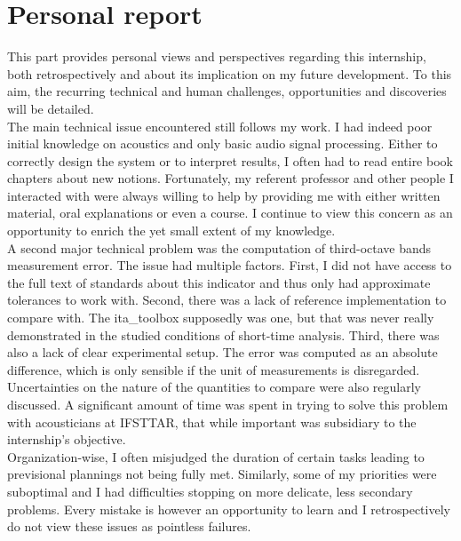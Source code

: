 \documentclass[12pt,times,onecolumn]{article}
\begin{document}
\clearpage
\part{Personal report}

This part provides personal views and perspectives regarding this internship, both retrospectively and about its implication on my future development. To this aim, the recurring technical and human challenges, opportunities and discoveries will be detailed.\\

The main technical issue encountered still follows my work. I had indeed poor initial knowledge on acoustics and only basic audio signal processing. Either to correctly design the system or to interpret results, I often had to read entire book chapters about new notions. Fortunately, my referent professor and other people I interacted with were always willing to help by providing me with either written material, oral explanations or even a course. I continue to view this concern as an opportunity to enrich the yet small extent of my knowledge.\\

A second major technical problem was the computation of third-octave bands measurement error. The issue had multiple factors. First, I did not have access to the full text of standards about this indicator and thus only had approximate tolerances to work with. Second, there was a lack of reference implementation to compare with. The ita\_toolbox supposedly was one, but that was never really demonstrated in the studied conditions of short-time analysis. Third, there was also a lack of clear experimental setup. The error was computed as an absolute difference, which is only sensible if the unit of measurements is disregarded. Uncertainties on the nature of the quantities to compare were also regularly discussed. A significant amount of time was spent in trying to solve this problem with acousticians at IFSTTAR, that while important was subsidiary to the internship's objective.\\

Organization-wise, I often misjudged the duration of certain tasks leading to previsional plannings not being fully met. Similarly, some of my priorities were suboptimal and I had difficulties stopping on more delicate, less secondary problems. Every mistake is however an opportunity to learn and I retrospectively do not view these issues as pointless failures.\\
\end{document}
